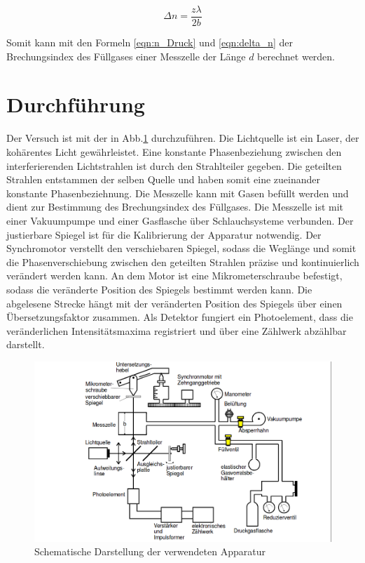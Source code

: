 \begin{equation}
  \label{eqn:delta_n}
  \Delta n = \frac{z\lambda}{2b}
\end{equation}

Somit kann mit den Formeln \eqref{eqn:n_Druck} und \eqref{eqn:delta_n} der Brechungsindex
des Füllgases einer Messzelle der Länge $d$ berechnet werden.


\section{Durchführung}

Der Versuch ist mit der in Abb.\ref{fig:Apparatur} durchzuführen.
Die Lichtquelle ist ein Laser, der kohärentes Licht gewährleistet.
Eine konstante Phasenbeziehung zwischen den interferierenden Lichtstrahlen ist
durch den Strahlteiler gegeben. Die geteilten Strahlen entstammen der selben Quelle
und haben somit eine zueinander konstante Phasenbeziehnung.
Die Messzelle kann mit Gasen befüllt werden und dient zur Bestimmung
des Brechungsindex des Füllgases. Die Messzelle ist mit einer Vakuumpumpe und einer
Gasflasche über Schlauchsysteme verbunden.
Der justierbare Spiegel ist
für die Kalibrierung der Apparatur notwendig. Der Synchromotor verstellt den
verschiebaren Spiegel, sodass die Weglänge und somit die Phasenverschiebung
zwischen den geteilten Strahlen präzise und kontinuierlich verändert werden kann.
An dem Motor ist eine Mikrometerschraube befestigt, sodass die veränderte Position des
Spiegels bestimmt werden kann. Die abgelesene Strecke hängt mit der veränderten
Position des Spiegels über einen Übersetzungsfaktor zusammen.
Als Detektor fungiert ein Photoelement, dass die veränderlichen Intensitätsmaxima
registriert und über eine Zählwerk abzählbar darstellt.

\begin{figure}
  \centering
  \includegraphics[width=\textwidth]{Interferometer.png}
  \caption{Schematische Darstellung der verwendeten Apparatur\cite{sample}}
  \label{fig:Apparatur}
\end{figure}


